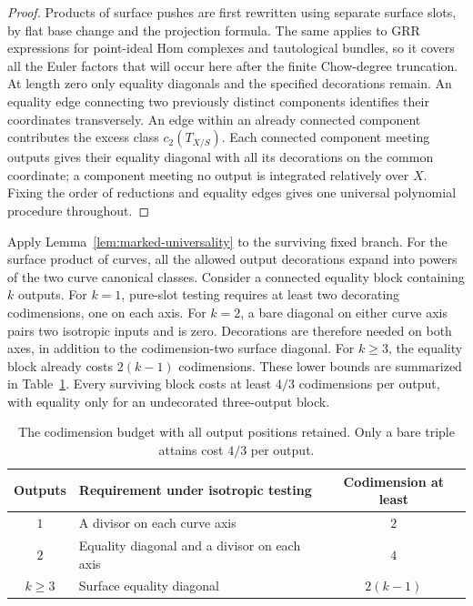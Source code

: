 \begin{proof}
Products of surface pushes are first rewritten using separate surface
slots, by flat base change and the projection formula.
The same applies to GRR expressions for point-ideal Hom complexes
and tautological bundles, so it covers all the Euler factors that
will occur here after the finite Chow-degree truncation.
At length zero only equality diagonals and the specified decorations
remain. An equality edge connecting two previously distinct
components identifies their coordinates transversely.
An edge within an already connected component contributes the excess
class \(c_2(T_{X/S})\).
Each connected component meeting outputs gives their equality
diagonal with all its decorations on the common coordinate;
a component meeting no output is integrated relatively over \(X\).
Fixing the order of reductions and equality edges gives one universal
polynomial procedure throughout.
\end{proof}

Apply Lemma~\ref{lem:marked-universality} to the surviving fixed
branch. For the surface product of curves,
all the allowed output decorations expand into powers of the two
curve canonical classes.
Consider a connected equality block containing \(k\) outputs.
For \(k=1\), pure-slot testing requires at least two decorating
codimensions, one on each axis.
For \(k=2\), a bare diagonal on either curve axis pairs two isotropic
inputs and is zero. Decorations are therefore needed on both axes,
in addition to the codimension-two surface diagonal.
For \(k\geq3\), the equality block already costs \(2(k-1)\)
codimensions.
These lower bounds are summarized in Table~\ref{tab:block-costs}.
Every surviving block costs at least \(4/3\) codimensions per output,
with equality only for an undecorated three-output block.

\begin{table}[tb]
\centering
\begin{tabular}{@{}clc@{}}
\toprule
Outputs & Requirement under isotropic testing & Codimension at least\\
\midrule
\(1\) & A divisor on each curve axis & \(2\)\\
\(2\) & Equality diagonal and a divisor on each axis & \(4\)\\
\(k\geq3\) & Surface equality diagonal & \(2(k-1)\)\\
\bottomrule
\end{tabular}
\caption{The codimension budget with all output positions retained.
Only a bare triple attains cost \(4/3\) per output.}
\label{tab:block-costs}
\end{table}

